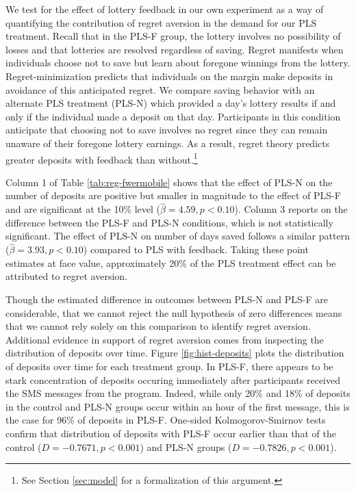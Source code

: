 \documentclass[11pt]{article}
\begin{document}
		We test for the effect of lottery feedback in our own experiment as a way of quantifying the contribution of regret aversion in the demand for our PLS treatment. Recall that in the PLS-F group, the lottery involves no possibility of losses and that lotteries are resolved regardless of saving. Regret manifests when individuals choose not to save but learn about foregone winnings from the lottery. Regret-minimization predicts that individuals on the margin make deposits in avoidance of this anticipated regret. We compare saving behavior with an alternate PLS treatment (PLS-N) which provided a day's lottery results if and only if the individual made a deposit on that day. Participants in this condition anticipate that choosing not to save involves no regret since they can remain unaware of their foregone lottery earnings. As a result, regret theory predicts greater deposits with feedback than without.\footnote{See Section \ref{sec:model} for a formalization of this argument.}

		Column 1 of Table \ref{tab:reg-fwermobile} shows that the effect of PLS-N on the number of deposits are positive but smaller in magnitude to the effect of PLS-F and are significant at the 10\% level ($\hat \beta = 4.59, p < 0.10$). Column 3 reports on the difference between the PLS-F and PLS-N conditions, which is not statistically significant. The effect of PLS-N on number of days saved follows a similar pattern ($\hat \beta = 3.93, p < 0.10$) compared to PLS with feedback. Taking these point estimates at face value, approximately 20\% of the PLS treatment effect can be attributed to regret aversion.

		Though the estimated difference in outcomes between PLS-N and PLS-F are considerable, that we cannot reject the null hypothesis of zero differences means that we cannot rely solely on this comparison to identify regret aversion. Additional evidence in support of regret aversion comes from inspecting the distribution of deposits over time. Figure \ref{fig:hist-deposits} plots the distribution of deposits over time for each treatment group. In PLS-F, there appears to be stark concentration of deposits occuring immediately after participants received the SMS messages from the program. Indeed, while only 20\% and 18\% of deposits in the control and PLS-N groups occur within an hour of the first message, this is the case for 96\% of deposits in PLS-F. One-sided Kolmogorov-Smirnov tests confirm that distribution of deposits with PLS-F occur earlier than that of the control ($D = -0.7671, p < 0.001$) and PLS-N groups ($D = -0.7826, p < 0.001$).
\end{document}
